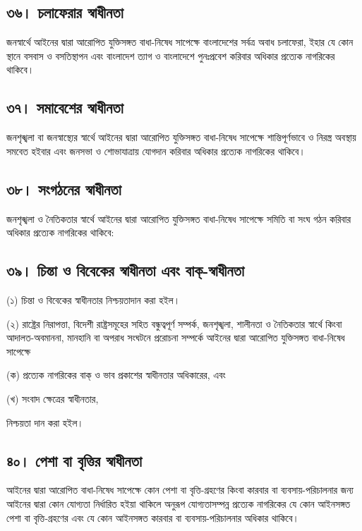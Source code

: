 \documentclass[11pt]{article}
\begin{document}
\subsection{৩৬। চলাফেরার স্বাধীনতা}
\label{sec:orgbcc33e5}
জনস্বার্থে আইনের দ্বারা আরোপিত যুক্তিসঙ্গত বাধা-নিষেধ সাপেক্ষে বাংলাদেশের
সর্বত্র অবাধ চলাফেরা, ইহার যে কোন স্থানে বসবাস ও বসতিস্থাপন এবং বাংলাদেশ
ত্যাগ ও বাংলাদেশে পুনঃপ্রবেশ করিবার অধিকার প্রত্যেক নাগরিকের থাকিবে।

\subsection{৩৭। সমাবেশের স্বাধীনতা}
\label{sec:org1e6c721}
জনশৃঙ্খলা বা জনস্বাস্থ্যের স্বার্থে আইনের দ্বারা আরোপিত যুক্তিসঙ্গত বাধা-নিষেধ
সাপেক্ষে শান্তিপূর্ণভাবে ও নিরস্ত্র অবস্থায় সমবেত হইবার এবং জনসভা ও
শোভাযাত্রায় যোগদান করিবার অধিকার প্রত্যেক নাগরিকের থাকিবে।

\subsection{৩৮। সংগঠনের স্বাধীনতা}
\label{sec:orgfd69128}
জনশৃঙ্খলা ও নৈতিকতার স্বার্থে আইনের দ্বারা আরোপিত যুক্তিসঙ্গত বাধা-নিষেধ
সাপেক্ষে সমিতি বা সংঘ গঠন করিবার অধিকার প্রত্যেক নাগরিকের থাকিবে:

\subsection{৩৯। চিন্তা ও বিবেকের স্বাধীনতা এবং বাক্-স্বাধীনতা}
\label{sec:orgb47f827}
(১) চিন্তা ও বিবেকের স্বাধীনতার নিশ্চয়তাদান করা হইল।

(২) রাষ্ট্রের নিরাপত্তা, বিদেশী রাষ্ট্রসমূহের সহিত বন্ধুত্বপূর্ণ সম্পর্ক, জনশৃঙ্খলা,
    শালীনতা ও নৈতিকতার স্বার্থে কিংবা আদালত-অবমাননা, মানহানি বা অপরাধ সংঘটনে
    প্ররোচনা সম্পর্কে আইনের দ্বারা আরোপিত যুক্তিসঙ্গত বাধা-নিষেধ সাপেক্ষে

(ক) প্রত্যেক নাগরিকের বাক্ ও ভাব প্রকাশের স্বাধীনতার অধিকারের, এবং

(খ) সংবাদ ক্ষেত্রের স্বাধীনতার,

নিশ্চয়তা দান করা হইল।

\subsection{৪০। পেশা বা বৃত্তির স্বাধীনতা}
\label{sec:orgc15efd4}
আইনের দ্বারা আরোপিত বাধা-নিষেধ সাপেক্ষে কোন পেশা বা বৃত্তি-গ্রহণের কিংবা
কারবার বা ব্যবসায়-পরিচালনার জন্য আইনের দ্বারা কোন যোগ্যতা নির্ধারিত হইয়া
থাকিলে অনুরূপ যোগ্যতাসম্পন্ন প্রত্যেক নাগরিকের যে কোন আইনসঙ্গত পেশা বা
বৃত্তি-গ্রহণের এবং যে কোন আইনসঙ্গত কারবার বা ব্যবসায়-পরিচালনার অধিকার
থাকিবে।
\end{document}
